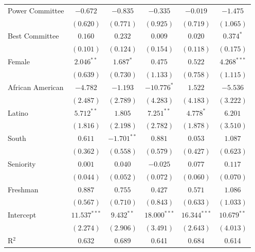 \documentclass[12pt]{article}
\begin{document}
\begin{table}[H]
\begin{threeparttable}
\begin{tabular}{l c c c c c }
Power Committee       & $-0.672$       & $-0.835$      & $-0.335$       & $-0.019$       & $-1.475$      \\
& $(0.620)$      & $(0.771)$     & $(0.925)$      & $(0.719)$      & $(1.065)$     \\
Best Committee        & $0.160$        & $0.232$       & $0.009$        & $0.020$        & $0.374^{*}$   \\
& $(0.101)$      & $(0.124)$     & $(0.154)$      & $(0.118)$      & $(0.175)$     \\
Female                 & $2.046^{**}$   & $1.687^{*}$   & $0.475$        & $0.522$        & $4.268^{***}$ \\
& $(0.639)$      & $(0.730)$     & $(1.133)$      & $(0.758)$      & $(1.115)$     \\
African American                   & $-4.782$       & $-1.193$      & $-10.776^{*}$  & $1.522$        & $-5.536$      \\
& $(2.487)$      & $(2.789)$     & $(4.283)$      & $(4.183)$      & $(3.222)$     \\
Latino                 & $5.712^{**}$   & $1.805$       & $7.251^{**}$   & $4.778^{*}$    & $6.201$       \\
& $(1.816)$      & $(2.198)$     & $(2.782)$      & $(1.878)$      & $(3.510)$     \\
South                  & $0.611$        & $-1.701^{**}$ & $0.881$        & $0.053$        & $1.087$       \\
& $(0.362)$      & $(0.558)$     & $(0.579)$      & $(0.427)$      & $(0.623)$     \\
Seniority              & $0.001$        & $0.040$       & $-0.025$       & $0.077$        & $0.117$       \\
& $(0.044)$      & $(0.052)$     & $(0.072)$      & $(0.060)$      & $(0.070)$     \\
Freshman               & $0.887$        & $0.755$       & $0.427$        & $0.571$        & $1.086$       \\
& $(0.567)$      & $(0.710)$     & $(0.843)$      & $(0.633)$      & $(1.033)$     \\
Intercept            & $11.537^{***}$ & $9.432^{**}$  & $18.000^{***}$ & $16.344^{***}$ & $10.679^{**}$ \\
& $(2.274)$      & $(2.906)$     & $(3.491)$      & $(2.643)$      & $(4.013)$     \\
\hline
R$^2$                  & 0.632          & 0.689         & 0.641          & 0.684          & 0.614         \\

\end{tabular}
\end{threeparttable}
\end{table}
\end{document}
